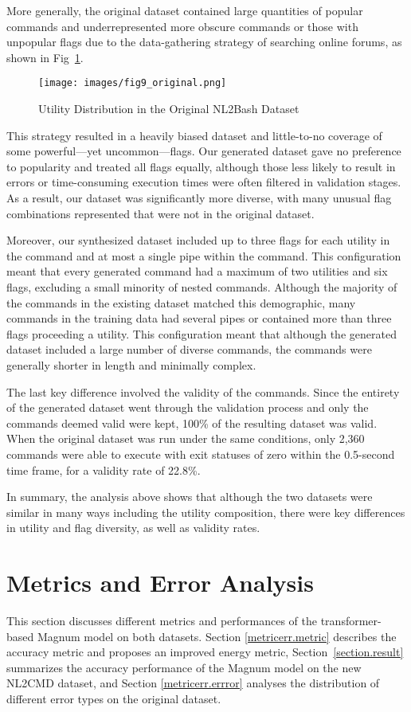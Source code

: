 \documentclass{river-journal}
\begin{document}
More generally, the original dataset contained large quantities of popular commands and underrepresented more obscure commands or those with unpopular flags due to the data-gathering strategy of searching online forums, as shown in Fig~\ref{figori}. 
\begin{figure}[hbpt]
\centering
\texttt{[image: images/fig9\_original.png]}
\caption{Utility Distribution in the Original NL2Bash Dataset}
\label{figori}
\end{figure}
This strategy resulted in a heavily biased dataset and little-to-no coverage of some powerful---yet uncommon---flags. Our generated dataset gave no preference to popularity and treated all flags equally, although those less likely to result in errors or time-consuming execution times were often filtered in validation stages. As a result, our dataset was significantly more diverse, with many unusual flag combinations represented that were not in the original dataset.

Moreover, our synthesized dataset included up to three flags for each utility in the command and at most a single pipe within the command. This configuration meant that every generated command had a maximum of two utilities and six flags, excluding a small minority of nested commands. Although the majority of the commands in the existing dataset matched this demographic, many commands in the training data had several pipes or contained more than three flags proceeding a utility. This configuration meant that although the generated dataset included a large number of diverse commands, the commands were generally shorter in length and minimally complex.

The last key difference involved the validity of the commands. Since the entirety of the generated dataset went through the validation process and only the commands deemed valid were kept, 100\% of the resulting dataset was valid. When the original dataset was run under the same conditions, only 2,360 commands were able to execute with exit statuses of zero within the 0.5-second time frame, for a validity rate of 22.8\%.

In summary, the analysis above shows that although the two datasets were similar in many ways including the utility composition, there were key differences in utility and flag diversity, as well as validity rates.

\section{Metrics and Error Analysis}\label{metrics}	
\label{metricerr}
This section discusses different metrics and performances of the transformer-based Magnum model on both datasets. Section \ref{metricerr.metric} describes the accuracy metric and proposes an improved energy metric, Section~\ref{section.result} summarizes the accuracy performance of the Magnum model on the new NL2CMD dataset, and Section \ref{metricerr.errror} analyses the distribution of different error types on the original dataset.
\end{document}
